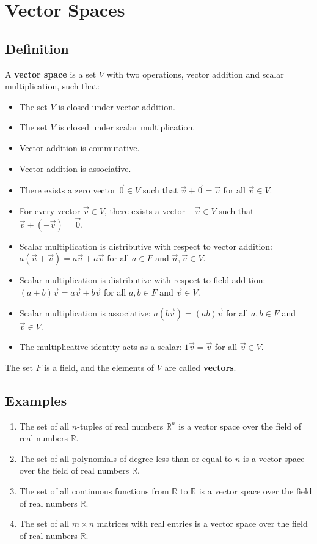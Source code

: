 \section{Vector Spaces}

\subsection{Definition}

A \textbf{vector space} is a set $V$ with two operations, vector addition and scalar multiplication, such that:

\begin{itemize}[label=$-$]
	\item The set $V$ is closed under vector addition.
	\item The set $V$ is closed under scalar multiplication.
	\item Vector addition is commutative.
	\item Vector addition is associative.
	\item There exists a zero vector $\vec{0} \in V$ such that $\vec{v} + \vec{0} = \vec{v}$ for all $\vec{v} \in V$.
	\item For every vector $\vec{v} \in V$, there exists a vector $-\vec{v} \in V$ such that $\vec{v} + (-\vec{v}) = \vec{0}$.
	\item Scalar multiplication is distributive with respect to vector addition: $a(\vec{u} + \vec{v}) = a\vec{u} + a\vec{v}$ for all $a \in F$ and $\vec{u}, \vec{v} \in V$.
	\item Scalar multiplication is distributive with respect to field addition: $(a + b)\vec{v} = a\vec{v} + b\vec{v}$ for all $a, b \in F$ and $\vec{v} \in V$.
	\item Scalar multiplication is associative: $a(b\vec{v}) = (ab)\vec{v}$ for all $a, b \in F$ and $\vec{v} \in V$.
	\item The multiplicative identity acts as a scalar: $1\vec{v} = \vec{v}$ for all $\vec{v} \in V$.
\end{itemize}
The set $F$ is a field, and the elements of $V$ are called \textbf{vectors}.

\subsection{Examples}

\begin{enumerate}
	\item The set of all $n$-tuples of real numbers $\mathbb{R}^n$ is a vector space over the field of real numbers $\mathbb{R}$.
	\item The set of all polynomials of degree less than or equal to $n$ is a vector space over the field of real numbers $\mathbb{R}$.
	\item The set of all continuous functions from $\mathbb{R}$ to $\mathbb{R}$ is a vector space over the field of real numbers $\mathbb{R}$.
	\item The set of all $m \times n$ matrices with real entries is a vector space over the field of real numbers $\mathbb{R}$.
\end{enumerate}

